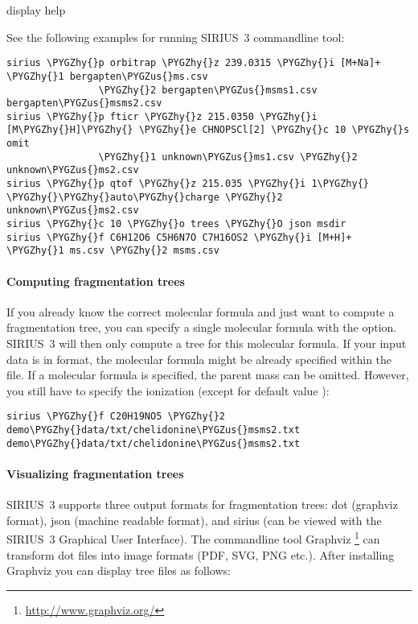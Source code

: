 \documentclass[letterpaper,10pt,openany,oneside]{sphinxmanual}
\def\PYGZus{\char`\_}
\def\PYGZhy{\char`\-}
\begin{document}
\begin{fulllineitems}
\label{commandline:cmdoption-h}
display help

\end{fulllineitems}


See the following examples for running SIRIUS~3 commandline tool:

\begin{Verbatim}[commandchars=\\\{\}]
sirius \PYGZhy{}p orbitrap \PYGZhy{}z 239.0315 \PYGZhy{}i [M+Na]+ \PYGZhy{}1 bergapten\PYGZus{}ms.csv
                \PYGZhy{}2 bergapten\PYGZus{}msms1.csv bergapten\PYGZus{}msms2.csv
sirius \PYGZhy{}p fticr \PYGZhy{}z 215.0350 \PYGZhy{}i [M\PYGZhy{}H]\PYGZhy{} \PYGZhy{}e CHNOPSCl[2] \PYGZhy{}c 10 \PYGZhy{}s omit
                \PYGZhy{}1 unknown\PYGZus{}ms1.csv \PYGZhy{}2 unknown\PYGZus{}ms2.csv
sirius \PYGZhy{}p qtof \PYGZhy{}z 215.035 \PYGZhy{}i 1\PYGZhy{} \PYGZhy{}\PYGZhy{}auto\PYGZhy{}charge \PYGZhy{}2 unknown\PYGZus{}ms2.csv
sirius \PYGZhy{}c 10 \PYGZhy{}o trees \PYGZhy{}O json msdir
sirius \PYGZhy{}f C6H12O6 C5H6N7O C7H16OS2 \PYGZhy{}i [M+H]+ \PYGZhy{}1 ms.csv \PYGZhy{}2 msms.csv
\end{Verbatim}


\paragraph{Computing fragmentation trees}
\label{commandline:computing-fragmentation-trees}
If you already know the correct molecular formula and just want to compute a
fragmentation tree, you can specify a single molecular formula with
the  option. SIRIUS~3 will then only compute a tree for this
molecular formula. If your input data is in  format, the molecular
formula might be already specified within the file. If a molecular formula is
specified, the parent mass can be omitted. However, you still have to specify
the ionization (except for default value \code{{[}M+H{]}+}):

\begin{Verbatim}[commandchars=\\\{\}]
sirius \PYGZhy{}f C20H19NO5 \PYGZhy{}2 demo\PYGZhy{}data/txt/chelidonine\PYGZus{}msms2.txt demo\PYGZhy{}data/txt/chelidonine\PYGZus{}msms2.txt
\end{Verbatim}


\paragraph{Visualizing fragmentation trees}
\label{commandline:visualizing-fragmentation-trees}
SIRIUS~3 supports three output formats for fragmentation trees: dot (graphviz format), json (machine readable format), and sirius (can be viewed with the SIRIUS~3 Graphical User Interface). The commandline tool Graphviz \footnote{\sphinxAtStartFootnote%
\url{http://www.graphviz.org/}
} can transform dot files into image formats (PDF, SVG, PNG etc.). After installing Graphviz you can display tree files as follows:
\end{document}
